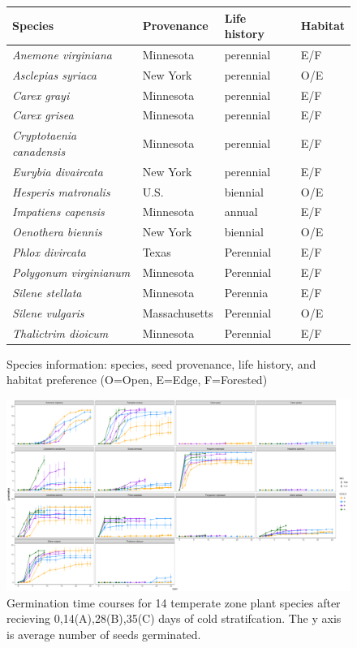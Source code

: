 \documentclass[12pt]{article}\usepackage[]{graphicx}\usepackage[]{color}
\begin{document}
\begin{figure}[here]
\begin{center}
\begin{tabular}{|l|l|l|l|}
\hline
\textbf{Species} & \textbf{Provenance} & \textbf{Life history} & \textbf{Habitat}\\
\hline
\textit{Anemone virginiana} & Minnesota & perennial & E/F\\
\hline
\textit{Asclepias syriaca} & New York & perennial & O/E \\
\hline
\textit{Carex grayi} & Minnesota & perennial & E/F\\
\hline
\textit{Carex grisea}& Minnesota & perennial & E/F\\
\hline
\textit{Cryptotaenia canadensis} & Minnesota & perennial & E/F\\
\hline
\textit{Eurybia divaircata} & New York & perennial & E/F\\
\hline
\textit{Hesperis matronalis} & U.S. & biennial & O/E\\
\hline
\textit{Impatiens capensis} & Minnesota & annual & E/F \\
\hline
\textit{Oenothera biennis} & New York & biennial & O/E \\
\hline
\textit{Phlox divircata} & Texas & Perennial & E/F\\
\hline
\textit{Polygonum virginianum} & Minnesota & Perennial & E/F\\
\hline
\textit{Silene stellata} & Minnesota & Perennia & E/F\\
\hline
\textit{Silene vulgaris} & Massachusetts & Perennial & O/E\\
\hline
\textit{Thalictrim dioicum} & Minnesota & Perennial & E/F\\
\hline
\end{tabular}
\caption{Species information: species, seed provenance, life history, and habitat preference (O=Open, E=Edge, F=Forested)}
\label{fig:Figure 5}
\end{center}
\end{figure}


\begin{figure}[here]
\begin{center}
\includegraphics[width=\textwidth]{..//figures/time_course_out.pdf}
\caption{Germination time courses for 14 temperate zone plant species after recieving 0,14(A),28(B),35(C) days of cold stratifcation. The y axis is average number of seeds germinated.}
\label{fig:Figure 6}
\end{center}
\end{figure}
\end{document}
